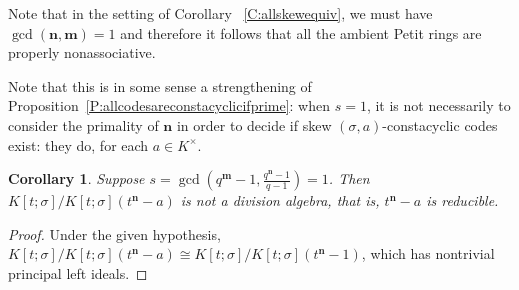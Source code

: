 \documentclass[11pt]{amsart}
\theoremstyle{plain}
\newtheorem{corollary}[theorem]{Corollary}
\theoremstyle{definition}
\numberwithin{equation}{section}
\numberwithin{figure}{section}
\newcommand{\Kone}[1]{K[t;\sigma]/K[t;\sigma](t^{\de}-#1)}
\newcommand{\os}{{\mathbf{m}}}  %
\newcommand{\de}{{\mathbf{n}}}  %
\begin{document}
Note that in the setting of Corollary~
\ref{C:allskewequiv}, we must have $\gcd(\de,\os)=1$ and therefore it follows that  all the ambient Petit rings are properly nonassociative.













Note that this is in some sense a strengthening of Proposition~\ref{P:allcodesareconstacyclicifprime}: when $s=1$, it is not necessarily to consider the primality of $\de$ in order to decide if skew $(\sigma,a)$-constacyclic codes exist: they do, for each $a\in K^\times$.

\begin{corollary}
    Suppose $s=\gcd\left(q^\os-1, \frac{q^\de-1}{q-1}\right)=1$. Then $\Kone{a}$ is not a division algebra, that is, $t^\de-a$ is reducible.
\end{corollary}

\begin{proof}
    Under the given hypothesis, $\Kone{a}\cong \Kone{1}$, which has nontrivial principal left ideals.
\end{proof}
\end{document}
